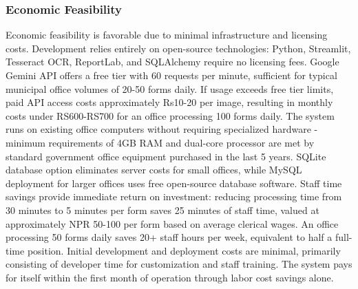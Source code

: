 \documentclass[12pt]{report}
\begin{document}
\subsubsection{Economic Feasibility}
Economic feasibility is favorable due to minimal infrastructure and licensing costs. Development relies entirely on open-source technologies: Python, Streamlit, Tesseract OCR, ReportLab, and SQLAlchemy require no licensing fees. Google Gemini API offers a free tier with 60 requests per minute, sufficient for typical municipal office volumes of 20-50 forms daily. If usage exceeds free tier limits, paid API access costs approximately Rs10-20 per image, resulting in monthly costs under RS600-RS700 for an office processing 100 forms daily. The system runs on existing office computers without requiring specialized hardware - minimum requirements of 
4GB RAM and dual-core processor are met by standard government office equipment purchased in the last 5 years. SQLite database option eliminates server costs for small offices, while MySQL deployment for larger offices uses free open-source database software. Staff time savings provide immediate return on investment: reducing processing time from 30 minutes to 5 minutes per form saves 25 minutes of staff time, valued at approximately NPR 50-100 per form based on average clerical wages. An office processing 50 forms daily saves 20+ staff hours per week, equivalent to half a full-time position. Initial development and deployment costs are minimal, primarily consisting of developer time for customization and staff training. The system pays for itself within the first month of operation through labor cost savings alone.
\end{document}
